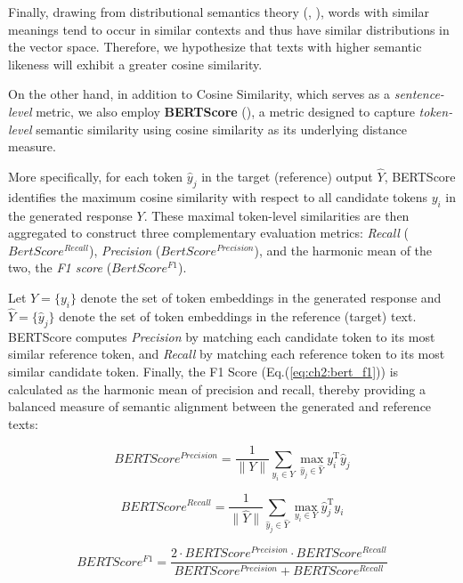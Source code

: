 Finally, drawing from distributional semantics theory (\cite{firth1957linguistics}, \cite{sahlgren2008distributional}), words with similar meanings tend to occur in similar contexts and thus have similar distributions in the vector space. Therefore, we hypothesize that texts with higher semantic likeness will exhibit a greater cosine similarity. 



On the other hand, in addition to Cosine Similarity, which serves as a \textit{sentence-level} metric, we also employ \textbf{BERTScore} (\cite{zhang2019bertscore}), a metric designed to capture \textit{token-level} semantic similarity using cosine similarity as its underlying distance measure.

More specifically, for each token $\hat{y}_j$ in the target (reference) output $\hat{Y}$, BERTScore identifies the maximum cosine similarity with respect to all candidate tokens $y_i$ in the generated response $Y$. These maximal token-level similarities are then aggregated to construct three complementary evaluation metrics: \textit{Recall} ($BertScore^{Recall}$), \textit{Precision} ($BertScore^{Precision}$), and the harmonic mean of the two, the \textit{F1 score} ($BertScore^{F1}$).


Let $Y=\{y_i\}$ denote the set of token embeddings in the generated response and $\hat{Y}=\{\hat{y}_j\}$ denote the set of token embeddings in the reference (target) text. BERTScore computes \textit{Precision} by matching each candidate token to its most similar reference token, and \textit{Recall} by matching each reference token to its most similar candidate token. Finally, the F1 Score (Eq.(\ref{eq:ch2:bert_f1})) is calculated as the harmonic mean of precision and recall, thereby providing a balanced measure of semantic alignment between the generated and reference texts:

\begin{equation}\label{eq:ch2:bert_precision}
    BERTScore^{Precision} = \frac{1}{\|Y\|}\sum_{y_i \in Y} \max_{\hat{y}_j \in \hat{Y}} y_i^{\text{T}}\hat{y}_j
\end{equation}

\begin{equation}\label{eq:ch2:bert_recall}
    BERTScore^{Recall} = \frac{1}{\|\hat{Y}\|}\sum_{\hat{y}_j \in \hat{Y}} \max_{y_i \in Y} \hat{y}_j^{\text{T}}y_i
\end{equation}

\begin{equation}\label{eq:ch2:bert_f1}
    BERTScore^{F1} = \frac{2\cdot BERTScore^{Precision}\cdot BERTScore^{Recall}}{BERTScore^{Precision}+BERTScore^{Recall}}
\end{equation}


